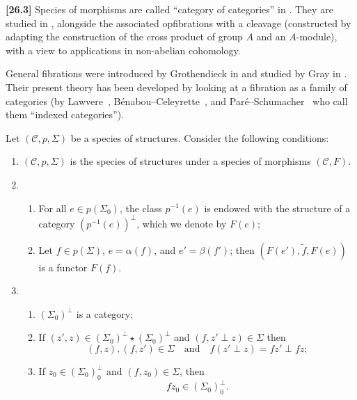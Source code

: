 \documentclass[a4paper,fleqn]{article}
\theoremstyle{plain}
\theoremstyle{definition}
\newenvironment{longcomm}[1]
  {\noindent\textbf{[#1]}\rmfamily}
  {}
\newcommand{\oldpage}[1]{{\marginpar{\footnotesize$\bigg\vert$\,\,\,\,\textit{p.~#1}}}}
\newcommand{\textand}{\quad\text{and}\quad}
\newcommand{\CC}{\mathcal{C}}
\begin{document}
\begin{longcomm}{26.3}
  Species of morphisms are called ``category of categories'' in \cite{comm28}.
  They are studied in \cite{coll70,coll77,coll122}, alongside the associated opfibrations with a cleavage (constructed by adapting the construction of the cross product of group $A$ and an $A$-module), with a view to applications in non-abelian cohomology.

  General fibrations were introduced by Grothendieck in \cite{comm43} and studied by Gray in \cite{comm38}.
  Their present theory has been developed by looking at a fibration as a family of categories (by Lawvere~\cite{comm65}, Bénabou--Celeyrette~\cite{comm8,comm19}, and Paré--Schumacher~\cite{comm82} who call them ``indexed categories'').
\end{longcomm}

Let $(\CC,p,\Sigma)$ be a species of structures.
Consider the following conditions:
\begin{enumerate}
  \item[(a)]
    $(\CC,p,\Sigma)$ is the species of structures under a species of morphisms $(\CC,F)$.
  \oldpage{355}
  \item[(b)]
    \begin{enumerate}
      \item[(b\textsubscript{1})]
        For all $e\in p(\Sigma_0)$, the class $p^{-1}(e)$ is endowed with the structure of a category $(p^{-1}(e))^\perp$, which we denote by $F(e)$;
      \item[(b\textsubscript{2})]
        Let $f\in p(\Sigma)$, $e=\alpha(f)$, and $e'=\beta(f')$;
        then $(F(e'),\widetilde{f},F(e))$ is a functor $F(f)$.
    \end{enumerate}
  \item[(c)]
    \begin{enumerate}
      \item[(c\textsubscript{1})]
        $(\Sigma_0)^\perp$ is a category;
      \item[(c\textsubscript{2})]
        If $(z',z)\in(\Sigma_0)^\perp\star(\Sigma_0)^\perp$ and $(f,z'\perp z)\in\Sigma$ then
        \[
          (f,z),(f,z')\in\Sigma
          \textand
          f(z'\perp z)=fz'\perp fz;
        \]
      \item[(c\textsubscript{3})]
        If $z_0\in(\Sigma_0)_0^\perp$ and $(f,z_0)\in\Sigma$, then
        \[
          fz_0\in(\Sigma_0)_0^\perp.
        \]
    \end{enumerate}
\end{enumerate}
\end{document}
